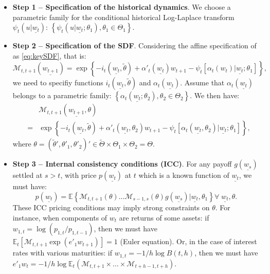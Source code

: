 \documentclass[
  12pt,
]{book}
\providecommand{\tightlist}{%
  \setlength{\itemsep}{0pt}\setlength{\parskip}{0pt}}
\theoremstyle{definition}
\theoremstyle{definition}
\theoremstyle{definition}
\theoremstyle{definition}
\theoremstyle{remark}
\begin{document}
\begin{itemize}
\tightlist
\item
  \textbf{Step 1 -- Specification of the historical dynamics}. We choose a parametric family for the conditional historical Log-Laplace transform \(\psi_t(u|\underline{w_t})\): \(\left\{ \psi_t (u|\underline{w_t} ; \theta_1), \theta_1 \in \Theta_1 \right\}\).
\item
  \textbf{Step 2 -- Specification of the SDF}. Considering the affine specification of as \eqref{eq:keySDF}, that is:
  \[
  \mathcal{M}_{t,t+1} (\underline{w_{t+1}}) = \exp\left\{ -i_{t}(\underline{w_t}, \tilde{\theta}) + \alpha'_t(\underline{w_t})w_{t+1} - \psi_t [\alpha_t (w_t)|\underline{w_t} ; \theta_1]\right\},
  \]
  we need to specifiy functions \(i_{t}(\underline{w_t}, \tilde{\theta})\) and \(\alpha_t(\underline{w_t})\). Assume that \(\alpha_t(\underline{w_t})\) belongs to a parametric family: \(\left\{ \alpha_t (\underline{w_t} ; \theta_2),\theta_2 \in \Theta_2 \right\}\).
  We then have:
  \begin{eqnarray*}
  &&\mathcal{M}_{t,t+1}(\underline{w_{t+1}}, \theta) \\
  &=& \exp \left\{ - i_{t}
  (\underline{w_t}, \tilde{\theta}) + \alpha'_t (\underline{w_t},\theta_2) w_{t+1} - \psi_{t} \left[ \alpha_t (\underline{w_t},
  \theta_2) | \underline{w_t} ; \theta_1 \right] \right\},
  \end{eqnarray*}
  where \(\theta = (\tilde{\theta}', \theta'_1,\theta'_2)' \in \tilde{\Theta}\times \Theta_1 \times \Theta_2 = \Theta\).
\item
  \textbf{Step 3 -- Internal consistency conditions (ICC)}. For any payoff \(g(\underline{w_s})\) settled at \(s>t\), with price \(p(\underline{w_t})\) at \(t\) which is a known function of
  \(\underline{w_t}\), we must have:
  \begin{equation*}
  p(\underline{w_t}) = \mathbb{E} \left\{\mathcal{M}_{t,t+1} (\theta) \dots \mathcal{M}_{s-1,s} (\theta) g(\underline{w_s})  |  \underline{w_t},
  \theta_1 \right\}    \forall \; \underline{w_t}, \theta.\label{eq:ICCgen}
  \end{equation*}
  These ICC pricing conditions may imply strong constraints on \(\theta\). For instance, when components of \(w_t\) are returns of some assets: if \(w_{1,t} = \log(p_{1,t}/p_{1,t-1})\), then we must have \(\mathbb{E}_t [\mathcal{M}_{t,t+1} \exp (e'_1 w_{t+1})]= 1\) (Euler equation). Or, in the case of interest rates with various maturities: if \(w_{1,t} = -1/h\log B(t,h)\), then we must have \(e'_1 w_{t} = - 1/h \log \mathbb{E}_t (\mathcal{M}_{t,t+1}\times \dots \times \mathcal{M}_{t+h-1,t+h})\).
\end{itemize}
\end{document}
